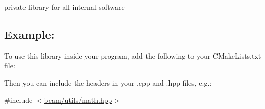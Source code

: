 private library for all internal software

\subsection*{Example\+:}

To use this library inside your program, add the following to your C\+Make\+Lists.\+txt file\+:




Then you can include the headers in your .cpp and .hpp files, e.\+g.\+:

{\ttfamily \#include $<$\hyperlink{math_8hpp}{beam/utils/math.\+hpp}$>$} 